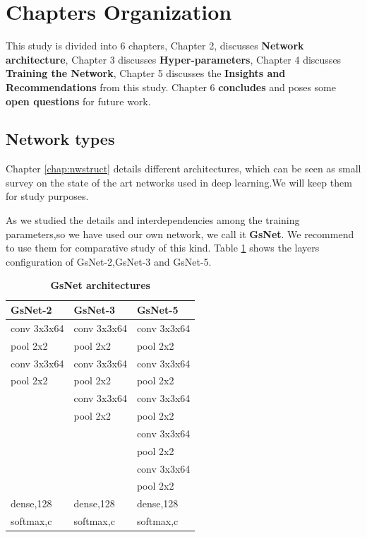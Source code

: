 \section{Chapters Organization}
This study is divided into 6 chapters, Chapter 2, discusses \textbf{Network architecture}, Chapter 3 discusses \textbf{Hyper-parameters}, Chapter 4 discusses \textbf{Training the Network}, Chapter 5 discusses the \textbf{Insights and Recommendations} from this study. Chapter 6 \textbf{concludes} and poses some \textbf{open questions} for future work.

\subsection{Network types}
Chapter \ref{chap:nwstruct} details different architectures, which can be seen as small survey on the state of the art networks used in deep learning.We will keep them for study purposes.

As we studied the details and interdependencies among the training parameters,so we have used our own network, we call it \textbf{ GsNet}. We recommend to use them for comparative study of this kind.
Table \ref{tab:gsnet} shows the layers configuration of GsNet-2,GsNet-3 and GsNet-5.
\begin{table}[!htbp]
	\centering
	\caption{\textbf{GsNet architectures}}
	\label{tab:gsnet}
	\vspace{2mm}
	\begin{tabular}{|l|l|l|}
		\hline
		\hline
		\textbf{GsNet-2} & \textbf{GsNet-3} & \textbf{GsNet-5} 		\\
		\hline
		\hline
		conv 3x3x64 & conv 3x3x64 	& conv 3x3x64 		\\
		pool 2x2    & pool 2x2 		& pool 2x2			\\
		\hline 
		conv 3x3x64 & conv 3x3x64 	& conv 3x3x64 		\\
		pool 2x2    & pool 2x2 		& pool 2x2 			\\
		\hline
		
		& conv 3x3x64 	& conv 3x3x64 		\\
		& pool 2x2 		& pool 2x2 			\\
		\hline
		&        		& conv 3x3x64 		\\
		&  				& pool 2x2 			\\
		\hline
		&  				& conv 3x3x64 		\\
		&  				& pool 2x2 			\\
		\hline
		dense,128 	& dense,128 	& dense,128  		\\
		\hline
		softmax,c 	& softmax,c 	& softmax,c  		\\
		\hline
		\hline
	\end{tabular}
\end{table}

